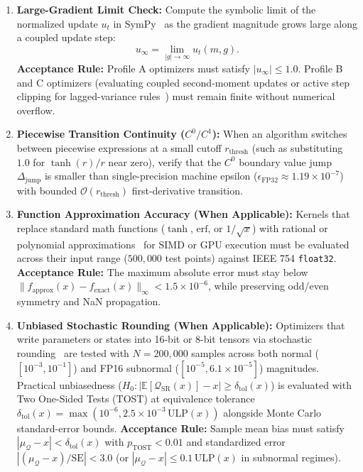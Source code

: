 \documentclass[11pt,a4paper]{article}
\renewcommand{\_}{\origunderscore\allowbreak}
\begin{document}
\begin{enumerate}[label=\textbf{S\arabic*.}, leftmargin=2.4em, itemsep=0.45em]
    \item \textbf{Large-Gradient Limit Check:} Compute the symbolic limit of the normalized update $u_t$ in SymPy~\cite{meurer2017sympy} as the gradient magnitude grows large along a coupled update step:
    \begin{equation}
        u_\infty = \lim_{|g| \to \infty} u_t(m, g).
    \end{equation}
    \textbf{Acceptance Rule:} Profile A optimizers must satisfy $|u_\infty| \le 1.0$. Profile B and C optimizers (evaluating coupled second-moment updates or active step clipping for lagged-variance rules~\cite{taniguchi2024adopt}) must remain finite without numerical overflow.

    \item \textbf{Piecewise Transition Continuity ($C^0/C^1$):} When an algorithm switches between piecewise expressions at a small cutoff $r_{\text{thresh}}$ (such as substituting $1.0$ for $\tanh(r)/r$ near zero), verify that the $C^0$ boundary value jump $\Delta_{\text{jump}}$ is smaller than single-precision machine epsilon ($\epsilon_{\text{FP32}} \approx 1.19 \times 10^{-7}$) with bounded $\mathcal{O}(r_{\text{thresh}})$ first-derivative transition.

    \item \textbf{Function Approximation Accuracy (When Applicable):} Kernels that replace standard math functions ($\tanh$, $\mathrm{erf}$, or $1/\sqrt{x}$) with rational or polynomial approximations~\cite{molina2020pade} for SIMD or GPU execution must be evaluated across their input range ($500,000$ test points) against IEEE 754 \texttt{float32}. \textbf{Acceptance Rule:} The maximum absolute error must stay below $\|f_{\text{approx}}(x) - f_{\text{exact}}(x)\|_\infty < 1.5 \times 10^{-6}$, while preserving odd/even symmetry and NaN propagation.

    \item \textbf{Unbiased Stochastic Rounding (When Applicable):} Optimizers that write parameters or states into 16-bit or 8-bit tensors via stochastic rounding~\cite{gupta2015limited,zamirai2021revisiting} are tested with $N = 200,000$ samples across both normal ($[10^{-3}, 10^{-1}]$) and FP16 subnormal ($[10^{-5}, 6.1 \times 10^{-5}]$) magnitudes. Practical unbiasedness ($H_0: |\mathbb{E}[\mathcal{Q}_{\text{SR}}(x)] - x| \ge \delta_{\text{tol}}(x)$) is evaluated with Two One-Sided Tests (TOST) at equivalence tolerance $\delta_{\text{tol}}(x) = \max(10^{-6}, 2.5 \times 10^{-3}\,\text{ULP}(x))$ alongside Monte Carlo standard-error bounds. \textbf{Acceptance Rule:} Sample mean bias must satisfy $|\mu_{\mathcal{Q}} - x| < \delta_{\text{tol}}(x)$ with $p_{\text{TOST}} < 0.01$ and standardized error $|(\mu_{\mathcal{Q}} - x)/\text{SE}| < 3.0$ (or $|\mu_{\mathcal{Q}} - x| \le 0.1\,\text{ULP}(x)$ in subnormal regimes).
\end{enumerate}
\end{document}
